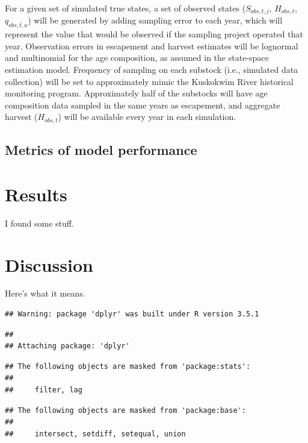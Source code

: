 \documentclass[12pt,]{book}
\theoremstyle{definition}
\theoremstyle{definition}
\theoremstyle{definition}
\theoremstyle{remark}
\begin{document}
For a given set of simulated true states, a set of observed states
(\(S_{obs,t,j}\), \(H_{obs,t}\), \(q_{obs,t,a}\)) will be generated by
adding sampling error to each year, which will represent the value that
would be observed if the sampling project operated that year.
Observation errors in escapement and harvest estimates will be lognormal
and multinomial for the age composition, as assumed in the state-space
estimation model. Frequency of sampling on each substock (i.e.,
simulated data collection) will be set to approximately mimic the
Kuskokwim River historical monitoring program. Approximately half of the
substocks will have age composition data sampled in the same years as
escapement, and aggregate harvest (\(H_{obs,t}\)) will be available
every year in each simulation.

\subsection{Metrics of model
performance}\label{metrics-of-model-performance}

\section{Results}\label{results}

I found some stuff.

\section{Discussion}\label{discussion}

Here's what it means.

\clearpage

\begin{verbatim}
## Warning: package 'dplyr' was built under R version 3.5.1
\end{verbatim}

\begin{verbatim}
## 
## Attaching package: 'dplyr'
\end{verbatim}

\begin{verbatim}
## The following objects are masked from 'package:stats':
## 
##     filter, lag
\end{verbatim}

\begin{verbatim}
## The following objects are masked from 'package:base':
## 
##     intersect, setdiff, setequal, union
\end{verbatim}
\end{document}
